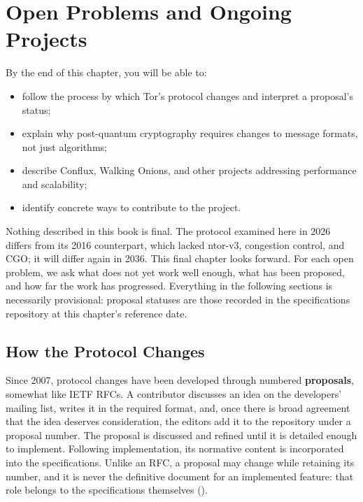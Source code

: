 \chapter{Open Problems and Ongoing Projects}\label{cap:31-futuro}

\begin{obiettivi}
By the end of this chapter, you will be able to:
\begin{itemize}[nosep]
  \item follow the process by which Tor's protocol changes and interpret a proposal's status;
  \item explain why post-quantum cryptography requires changes to message formats, not just algorithms;
  \item describe Conflux, Walking Onions, and other projects addressing performance and scalability;
  \item identify concrete ways to contribute to the project.
\end{itemize}
\end{obiettivi}

Nothing described in this book is final. The protocol examined here in 2026 differs from its 2016 counterpart, which lacked ntor-v3, congestion control, and CGO; it will differ again in 2036. This final chapter looks forward. For each open problem, we ask what does not yet work well enough, what has been proposed, and how far the work has progressed. Everything in the following sections is necessarily provisional: proposal statuses are those recorded in the specifications repository at this chapter's reference date.

\section{How the Protocol Changes}\label{sec:fut-processo}

Since 2007, protocol changes have been developed through numbered \textbf{proposals}, somewhat like IETF RFCs. A contributor discusses an idea on the developers' mailing list, writes it in the required format, and, once there is broad agreement that the idea deserves consideration, the editors add it to the repository under a proposal number. The proposal is discussed and refined until it is detailed enough to implement. Following implementation, its normative content is incorporated into the specifications. Unlike an RFC, a proposal may change while retaining its number, and it is never the definitive document for an implemented feature: that role belongs to the specifications themselves ().

